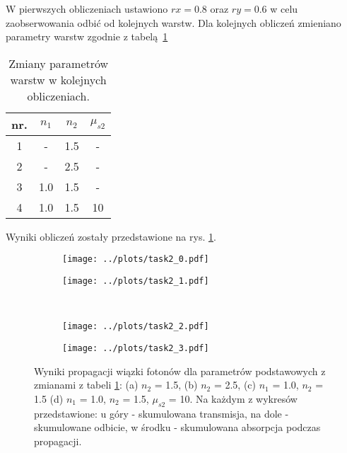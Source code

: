 \documentclass[a4paper, 12pt]{article}
\begin{document}
	W pierwszych obliczeniach ustawiono $rx = 0.8$ oraz $ry = 0.6$ w celu zaobserwowania odbić od kolejnych warstw. 
	Dla kolejnych obliczeń zmieniano parametry warstw zgodnie z tabelą \ref{tab:task2}
	
	\begin{table}[H]
		\caption{Zmiany parametrów warstw w kolejnych obliczeniach.}
		\label{tab:task2}
		\centering
		\begin{tabular}{|c|c|c|c|}
			\hline
			\rowcolor{LightCyan}
			nr. & $n_1$ & $n_2$ & $\mu_{s2}$ \\ \hline
			1 	& -		& 1.5	& - \\ \hline
			2	& - 	& 2.5	& - \\ \hline
			3	& 1.0 	& 1.5	& - \\ \hline
			4 	& 1.0	& 1.5	& 10 \\ \hline
		\end{tabular}
	\end{table}
	
	\noindent Wyniki obliczeń zostały przedstawione na rys. \ref{fig:task2_calc}.
	
	\begin{figure}[H]
		\centering
		\begin{subfigure}{0.49\textwidth}
			\centering
			\texttt{[image: ../plots/task2\_0.pdf]}
			\caption{}
		\end{subfigure}
		\begin{subfigure}{0.49\textwidth}
			\centering
			\texttt{[image: ../plots/task2\_1.pdf]}
			\caption{}
		\end{subfigure}
		\\
				\begin{subfigure}{0.49\textwidth}
			\centering
			\texttt{[image: ../plots/task2\_2.pdf]}
			\caption{}
		\end{subfigure}
		\begin{subfigure}{0.49\textwidth}
			\centering
			\texttt{[image: ../plots/task2\_3.pdf]}
			\caption{}
		\end{subfigure}
	\caption{Wyniki propagacji wiązki fotonów dla parametrów podstawowych z zmianami z tabeli \ref{tab:task2}: (a) $n_2$ = 1.5, (b) $n_2$ = 2.5, (c) $n_1$ = 1.0, $n_2$ = 1.5 (d) $n_1$ = 1.0, $n_2$ = 1.5, $\mu_{s2}$ = 10. Na każdym z wykresów przedstawione: u góry - skumulowana transmisja, na dole - skumulowane odbicie, w środku - skumulowana absorpcja podczas propagacji.}
	\label{fig:task2_calc}
	\end{figure}
	 
\end{document}
